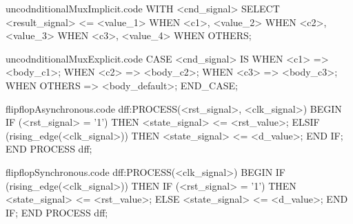 \documentclass[a4paper]{article}
\begin{document}
\begin{filecontents*}[overwrite]{uncodnditionalMuxImplicit.code}
WITH <cnd_signal> SELECT <result_signal> <=
    <value_1> WHEN <c1>,
    <value_2> WHEN <c2>,
    <value_3> WHEN <c3>,
    <value_4> WHEN OTHERS;
\end{filecontents*}

\begin{filecontents*}[overwrite]{uncodnditionalMuxExplicit.code}
CASE <cnd_signal> IS
    WHEN <c1> => <body_c1>;
    WHEN <c2> => <body_c2>;
    WHEN <c3> => <body_c3>;
    WHEN OTHERS => <body_default>;
END_CASE;
\end{filecontents*}


\begin{filecontents*}[overwrite]{flipflopAsynchronous.code}
dff:PROCESS(<rst_signal>, <clk_signal>)
BEGIN
    IF (<rst_signal> = '1') THEN
        <state_signal> <= <rst_value>;
    ELSIF (rising_edge(<clk_signal>)) THEN
        <state_signal> <= <d_value>;
    END IF;
END PROCESS dff;
\end{filecontents*}

\begin{filecontents*}[overwrite]{flipflopSynchronous.code}
dff:PROCESS(<clk_signal>)
BEGIN
    IF (rising_edge(<clk_signal>)) THEN
        IF (<rst_signal> = '1') THEN
            <state_signal> <= <rst_value>;
        ELSE
            <state_signal> <= <d_value>;
    END IF;
END PROCESS dff;
\end{filecontents*}


\end{document}

